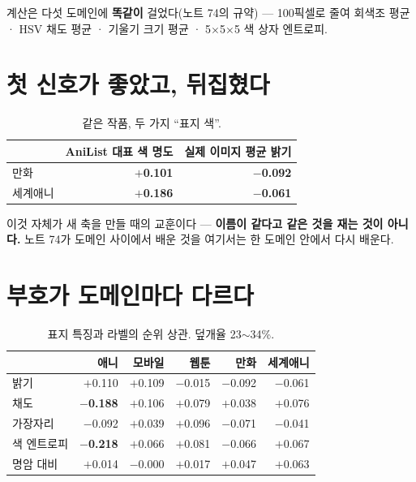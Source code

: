 \documentclass[10pt]{article}
\begin{document}
계산은 다섯 도메인에 \textbf{똑같이} 걸었다(노트 74의 규약) --- 100픽셀로 줄여
회색조 평균 · HSV 채도 평균 · 기울기 크기 평균 · 5$\times$5$\times$5 색 상자
엔트로피.

\section{첫 신호가 좋았고, 뒤집혔다}

\begin{table}[t]
\centering\tsize
\caption{같은 작품, 두 가지 ``표지 색''.}
\begin{tabular}{lrr}
\toprule
& AniList 대표 색 명도 & 실제 이미지 평균 밝기 \\
\midrule
만화 & \textbf{$+$0.101} & \textbf{$-$0.092} \\
세계애니 & \textbf{$+$0.186} & \textbf{$-$0.061} \\
\bottomrule
\end{tabular}
\end{table}


이것 자체가 새 축을 만들 때의 교훈이다 --- \textbf{이름이 같다고 같은 것을
재는 것이 아니다.} 노트 74가 도메인 사이에서 배운 것을 여기서는 한 도메인
안에서 다시 배운다.

\section{부호가 도메인마다 다르다}

\begin{table}[t]
\centering\tsize
\caption{표지 특징과 라벨의 순위 상관. 덮개율 23$\sim$34\%.}
\begin{tabular}{lrrrrr}
\toprule
& 애니 & 모바일 & 웹툰 & 만화 & 세계애니 \\
\midrule
밝기 & $+$0.110 & $+$0.109 & $-$0.015 & $-$0.092 & $-$0.061 \\
채도 & \textbf{$-$0.188} & $+$0.106 & $+$0.079 & $+$0.038 & $+$0.076 \\
가장자리 & $-$0.092 & $+$0.039 & $+$0.096 & $-$0.071 & $-$0.041 \\
색 엔트로피 & \textbf{$-$0.218} & $+$0.066 & $+$0.081 & $-$0.066 & $+$0.067 \\
명암 대비 & $+$0.014 & $-$0.000 & $+$0.017 & $+$0.047 & $+$0.063 \\
\bottomrule
\end{tabular}
\end{table}
\end{document}
